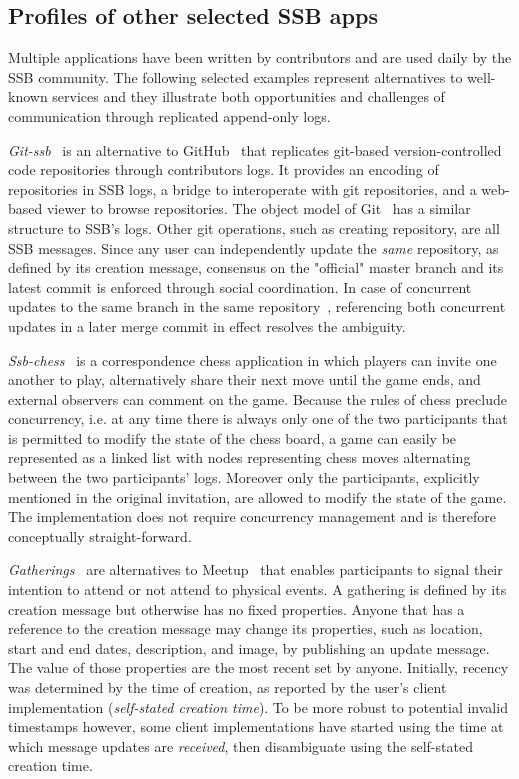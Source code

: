 \documentclass[9pt,sigconf]{acmart}
\begin{document}
\subsection{Profiles of other selected SSB apps}
\label{Section:AppProfiles}

Multiple applications have been written by contributors and are used daily by
the SSB community. The following selected examples represent
alternatives to well-known services and they illustrate both opportunities and
challenges of communication through replicated append-only logs.

\textit{Git-ssb}~\cite{git-ssb} is an alternative to GitHub~\cite{github} that
replicates git-based version-controlled code repositories through contributors
logs. It provides an encoding of repositories in SSB logs, a bridge to
interoperate with git repositories, and a web-based viewer to browse
repositories. The object model of Git~\cite{chacon2014pro} has a similar
structure to SSB's logs. Other git operations, such as creating repository, are
all SSB messages. Since any user can independently update the \textit{same} repository, as defined by its creation message, consensus on the "official" master branch and its latest commit is enforced
through social coordination. In case of concurrent updates to the same branch
in the same repository~\cite{git-ssb-push-conflict}, referencing both concurrent
updates in a later merge commit in effect resolves
the ambiguity.

\textit{Ssb-chess}~\cite{ssb-chess} is a correspondence chess application in
which players can invite one another to play, alternatively share their next
move until the game ends, and external observers can comment on the game.
Because the rules of chess preclude concurrency,  i.e. at any time there is always
 only one of the two participants that is permitted to modify the state of the chess board,
 a game can easily be represented as a linked list with nodes
representing chess moves alternating between the two participants' logs.
Moreover only the participants, explicitly mentioned in the original invitation, are
allowed to modify the state of the game. The implementation does not require
concurrency management and is therefore conceptually straight-forward.

\textit{Gatherings}~\cite{patch-gatherings} are alternatives to
Meetup~\cite{meetup.com} that enables participants to signal their intention to
attend or not attend to physical events. A gathering is defined by its creation message
but otherwise has no fixed properties. Anyone that has a reference to the creation message may
change its properties, such as location, start and end dates, description, and
image, by publishing an update message. The value of those properties are the
most recent set by anyone. Initially, recency was determined by the time of
creation, as reported by the user's client implementation (\textit{self-stated
creation time}). To be more robust to potential invalid
timestamps however, some client implementations have started using the time at
which message updates are \textit{received}, then disambiguate using the
self-stated creation time.
\end{document}
